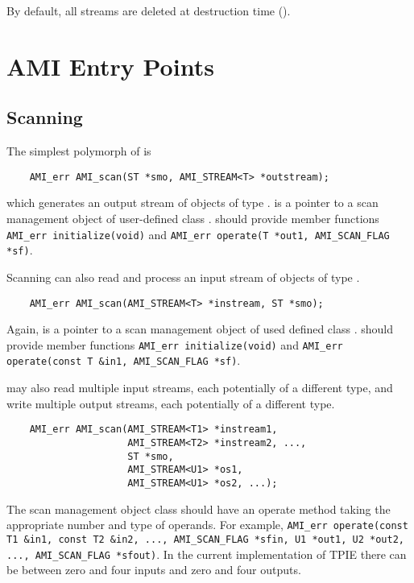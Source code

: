 By default, all streams are deleted at destruction time
().


\section{AMI Entry Points}


\subsection{Scanning}

The simplest polymorph of  is
\begin{verbatim}
    AMI_err AMI_scan(ST *smo, AMI_STREAM<T> *outstream);
\end{verbatim}
which generates an output stream of objects of type .
 is a pointer to a scan management object of user-defined
class .   should provide member functions {\tt
  AMI\_err initialize(void)} and {\tt AMI\_err operate(T *out1,
  AMI\_SCAN\_FLAG *sf)}.

Scanning can also read and process an input stream of objects of type
.  
\begin{verbatim}
    AMI_err AMI_scan(AMI_STREAM<T> *instream, ST *smo);
\end{verbatim}
Again,  is a pointer to a scan management object of used
defined class .   should provide member functions
{\tt AMI\_err initialize(void)} and {\tt AMI\_err operate(const T
  \&in1, AMI\_SCAN\_FLAG *sf)}.

 may also read multiple input streams, each
potentially of a different type, and write multiple output streams,
each potentially of a different type.  
\begin{verbatim}
    AMI_err AMI_scan(AMI_STREAM<T1> *instream1, 
                     AMI_STREAM<T2> *instream2, ..., 
                     ST *smo, 
                     AMI_STREAM<U1> *os1, 
                     AMI_STREAM<U1> *os2, ...);
\end{verbatim}
The scan management object class  should have an operate
method taking the appropriate number and type of operands.  For
example, {\tt AMI\_err operate(const T1 \&in1, const T2 \&in2, ...,
  AMI\_SCAN\_FLAG *sfin, U1 *out1, U2 *out2, ..., AMI\_SCAN\_FLAG
  *sfout)}.  In the current implementation of TPIE there can be
between zero and four inputs and zero and four outputs.


